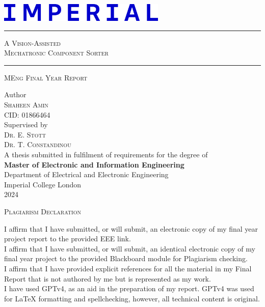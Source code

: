 \documentclass[12pt, a4paper]{article}
\begin{document}
\begin{titlepage}
  \noindent
  \includegraphics[width=80mm]{imgs/icl_logo.png}

  \centering
  \vspace{3.5cm}

  \rule{\textwidth}{0.5pt}
  \huge \textsc{A Vision-Assisted\\Mechatronic Component Sorter}
  \rule{\textwidth}{0.5pt}

  \vspace{1cm}
  \LARGE \textsc{MEng Final Year Report}
  
  \vspace{3cm}
  \large  Author\\
  \Large  \textsc{Shaheen Amin}\\
  \Large CID: 01866464\\

  \vspace{1.5cm}
  \large Supervised by\\
  \Large \textsc{Dr. E. Stott}\\
  \Large \textsc{Dr. T. Constandinou}\\

  \vfill
  \normalsize
  A thesis submitted in fulfilment of requirements for the degree of\\
  \textbf{Master of Electronic and Information Engineering}\\
  
  \vspace{0.5cm}
  \normalsize
  Department of Electrical and Electronic Engineering\\
  Imperial College London\\
  2024
  \vspace{1cm}
\end{titlepage}

\newpage
\vspace*{\fill}
\begin{center}
  \large\textsc{Plagiarism Declaration}\\
\end{center}
\noindent I affirm that I have submitted, or will submit, an electronic copy of my final year project report to the provided EEE link.\\
\noindent I affirm that I have submitted, or will submit, an identical electronic copy of my final year project to the provided Blackboard module for Plagiarism checking.\\
\noindent I affirm that I have provided explicit references for all the material in my Final Report that is not authored by me but is represented as my work.\\
\noindent I have used GPTv4, as an aid in the preparation of my report. GPTv4 was used for LaTeX formatting and spellchecking, however, all technical content is original.\\
\vspace*{\fill}
\end{document}
